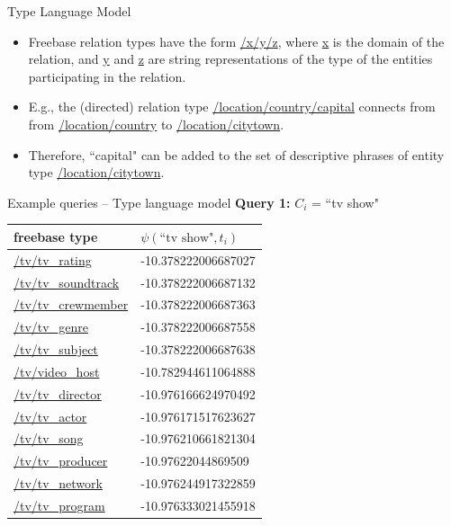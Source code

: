 \documentclass[pdf,11pt]{beamer}
\begin{document}
\begin{frame}{Type Language Model}
\begin{itemize}
\item Freebase relation types have the form \url{/x/y/z}, where \url{x} is the domain of the relation, and \url{y} and \url{z} are string representations of the type of the entities participating in the relation.
\item E.g., the (directed) relation type \url{/location/country/capital} connects from from \url{/location/country} to \url{/location/citytown}.
\item Therefore, ``capital" can be added to the set of descriptive phrases of entity type \url{/location/citytown}.
\end{itemize}
\end{frame}

\begin{frame}{Example queries -- Type language model}
\textbf{Query 1:} $C_i$ = ``tv show"
\begin{longtable}{| p{} | p{} |}
\hline
\textbf{freebase type} & $\psi(\text{``tv show"}, t_i)$ \\ \hline \hline

\url{/tv/tv_rating} & -10.378222006687027 \\ \hline
\url{/tv/tv_soundtrack} & -10.378222006687132 \\ \hline
\url{/tv/tv_crewmember} & -10.378222006687363 \\ \hline
\url{/tv/tv_genre} & -10.378222006687558 \\ \hline
\url{/tv/tv_subject} & -10.378222006687638 \\ \hline
\url{/tv/video_host} & -10.782944611064888 \\ \hline
\url{/tv/tv_director} & -10.976166624970492 \\ \hline
\url{/tv/tv_actor} & -10.976171517623627 \\ \hline
\url{/tv/tv_song} & -10.976210661821304 \\ \hline
\url{/tv/tv_producer} & -10.97622044869509 \\ \hline
\url{/tv/tv_network} & -10.976244917322859 \\ \hline
\url{/tv/tv_program} & -10.976333021455918 \\ \hline

\end{longtable}
\end{frame}
\end{document}
